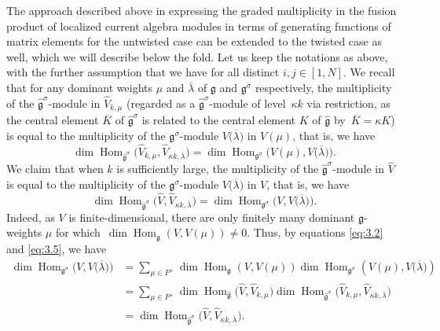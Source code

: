 \documentclass[pdftex]{sigma}
\numberwithin{equation}{section}
\DeclareMathOperator{\Hom}{Hom}
\begin{document}
The approach described above in expressing the graded multiplicity in the fusion product of localized current algebra modules in terms of generating functions of matrix elements for the untwisted case can be extended to the twisted case as well, which we will describe below the fold. Let us keep the notations as above, with the further assumption that we have  for all distinct $i,j\in[1,N]$. We recall that for any dominant weights $\mu$ and $\overline{\lambda}$ of $\mathfrak{g}$ and $\mathfrak{g}^{\sigma}$ respectively, the multiplicity of the $\widehat{\mathfrak{g}}^{\sigma}$-module  in $\widehat{V}_{k,\mu}$ (regarded as a $\widehat{\mathfrak{g}}^{\sigma}$-module of level~$\kappa k$ via restriction, as the central element $\overline{K}$ of $\widehat{\mathfrak{g}}^{\sigma}$ is related to the central element $K$ of $\widehat{\mathfrak{g}}$ by~${\overline{K}= \kappa K}$) is equal to the multiplicity of the $\mathfrak{g}^{\sigma}$-module $V\bigl(\overline{\lambda}\bigr)$ in $V(\mu)$, that is, we have
\begin{equation}\label{eq:3.5}
\dim\Hom_{\widehat{\mathfrak{g}}^{\sigma}}\bigl(\widehat{V}_{k,\mu},\widehat{V}_{\kappa k,\overline{\lambda}}\bigr)=\dim \Hom_{\mathfrak{g}^{\sigma}}\bigl(V(\mu),V\bigl(\overline{\lambda}\bigr)\bigr).
\end{equation}
We claim that when $k$ is sufficiently large, the multiplicity of the $\widehat{\mathfrak{g}}^{\sigma}$-module  in $\widehat{V}$ is equal to the multiplicity of the $\mathfrak{g}^{\sigma}$-module $V\bigl(\overline{\lambda}\bigr)$ in $V$, that is, we have
\begin{equation*}
\dim\Hom_{\widehat{\mathfrak{g}}^{\sigma}}\bigl(\widehat{V},\widehat{V}_{\kappa k,\overline{\lambda}}\bigr)=\dim \Hom_{\mathfrak{g}^{\sigma}}\bigl(V, V\bigl(\overline{\lambda}\bigr)\bigr).
\end{equation*}
Indeed, as $V$ is finite-dimensional, there are only finitely many dominant $\mathfrak{g}$-weights $\mu$ for which~${\dim\Hom_{\mathfrak{g}}(V, V(\mu))\neq 0}$. Thus, by equations \eqref{eq:3.2} and \eqref{eq:3.5}, we have
\begin{align*}
\dim \Hom_{\mathfrak{g}^{\sigma}}\bigl(V, V\bigl(\overline{\lambda}\bigr)\bigr)
&=\sum_{\mu\in P^+}\dim\Hom_{\mathfrak{g}}(V, V(\mu))\dim \Hom_{\mathfrak{g}^{\sigma}}(V(\mu), V\bigl(\overline{\lambda}\bigr))\\
&=\sum_{\mu\in P^+}\dim\Hom_{\widehat{\mathfrak{g}}}\bigl(\widehat{V},\widehat{V}_{k,\mu}\bigr)\dim\Hom_{\widehat{\mathfrak{g}}^{\sigma}}\bigl(\widehat{V}_{k,\mu},\widehat{V}_{\kappa k,\overline{\lambda}}\bigr)\\
&=\dim\Hom_{\widehat{\mathfrak{g}}^{\sigma}}\bigl(\widehat{V},\widehat{V}_{\kappa k,\overline{\lambda}}\bigr).
\end{align*}
\end{document}
